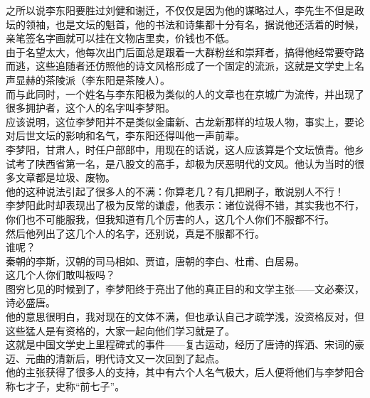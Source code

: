\begin{multicols}{\theparacolNo}
之所以说李东阳要胜过刘健和谢迁，不仅仅是因为他的谋略过人，李先生不但是政坛的领袖，也是文坛的魁首，他的书法和诗集都十分有名，据说他还活着的时候，亲笔签名字画就可以挂在文物店里卖，价钱也不低。\\

由于名望太大，他每次出门后面总是跟着一大群粉丝和崇拜者，搞得他经常要夺路而逃，这些追随者还仿照他的诗文风格形成了一个固定的流派，这就是文学史上名声显赫的茶陵派（李东阳是茶陵人）。\\

而与此同时，一个姓名与李东阳极为类似的人的文章也在京城广为流传，并出现了很多拥护者，这个人的名字叫李梦阳。\\

应该说明，这位李梦阳并不是类似金庸新、古龙新那样的垃圾人物，事实上，要论对后世文坛的影响和名气，李东阳还得叫他一声前辈。\\

李梦阳，甘肃人，时任户部郎中，用现在的话说，这人应该算是个文坛愤青。他乡试考了陕西省第一名，是八股文的高手，却极为厌恶明代的文风。他认为当时的很多文章都是垃圾、废物。\\

他的这种说法引起了很多人的不满：你算老几？有几把刷子，敢说别人不行！\\

李梦阳此时却表现出了极为反常的谦虚，他表示：诸位说得不错，其实我也不行，你们也不可能服我，但我知道有几个厉害的人，这几个人你们不服都不行。\\

然后他列出了这几个人的名字，还别说，真是不服都不行。\\

谁呢？\\

秦朝的李斯，汉朝的司马相如、贾谊，唐朝的李白、杜甫、白居易。\\

这几个人你们敢叫板吗？\\

图穷匕见的时候到了，李梦阳终于亮出了他的真正目的和文学主张——文必秦汉，诗必盛唐。\\

他的意思很明白，我对现在的文体不满，但也承认自己才疏学浅，没资格反对，但这些猛人是有资格的，大家一起向他们学习就是了。\\

这就是中国文学史上里程碑式的事件——复古运动，经历了唐诗的挥洒、宋词的豪迈、元曲的清新后，明代诗文又一次回到了起点。\\

他的主张获得了很多人的支持，其中有六个人名气极大，后人便将他们与李梦阳合称七才子，史称“前七子”。\\


\end{multicols}
